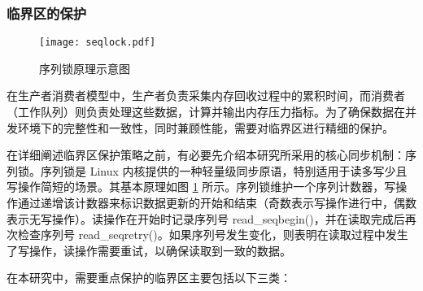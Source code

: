 \subsubsection{临界区的保护}

\begin{figure}[H]
    \centering
    \texttt{[image: seqlock.pdf]}
    \caption{序列锁原理示意图}
    \label{fig:seqlock}
\end{figure}
在生产者消费者模型中，生产者负责采集内存回收过程中的累积时间，而消费者（工作队列）则负责处理这些数据，计算并输出内存压力指标。为了确保数据在并发环境下的完整性和一致性，同时兼顾性能，需要对临界区进行精细的保护。

在详细阐述临界区保护策略之前，有必要先介绍本研究所采用的核心同步机制：序列锁。序列锁是 Linux 内核提供的一种轻量级同步原语，特别适用于读多写少且写操作简短的场景。其基本原理如图 \ref{fig:seqlock} 所示。序列锁维护一个序列计数器，写操作通过递增该计数器来标识数据更新的开始和结束（奇数表示写操作进行中，偶数表示无写操作）。读操作在开始时记录序列号 read\_seqbegin()，并在读取完成后再次检查序列号 read\_seqretry()。如果序列号发生变化，则表明在读取过程中发生了写操作，读操作需要重试，以确保读取到一致的数据。


在本研究中，需要重点保护的临界区主要包括以下三类：

